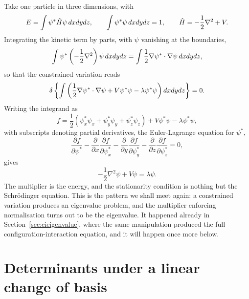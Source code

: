Take one particle in three dimensions, with
\begin{equation}
  E = \int \psi^{*}\hat{H}\psi\,dxdydz,
  \qquad
  \int \psi^{*}\psi\,dxdydz = 1,
  \qquad
  \hat{H} = -\frac{1}{2}\nabla^2 + V .
  \label{eq:6-oneparticle}
\end{equation}
Integrating the kinetic term by parts, with $\psi$ vanishing at the
boundaries,
\begin{equation}
  \int \psi^{*}\left(-\frac{1}{2}\nabla^2\right)\psi\,dxdydz
  = \int \frac{1}{2}\nabla\psi^{*}\cdot\nabla\psi\,dxdydz,
  \label{eq:6-byparts}
\end{equation}
so that the constrained variation reads
\begin{equation}
  \delta\left\{\int\left(\frac{1}{2}\nabla\psi^{*}\cdot\nabla\psi
    + V\psi^{*}\psi - \lambda\psi^{*}\psi\right)
    dxdydz\right\} = 0 .
  \label{eq:6-constrainedvariation}
\end{equation}
Writing the integrand as
\begin{equation}
  f = \frac{1}{2}\left(\psi^{*}_x\psi_x + \psi^{*}_y\psi_y
      + \psi^{*}_z\psi_z\right) + V\psi^{*}\psi - \lambda\psi^{*}\psi,
  \label{eq:6-integrand}
\end{equation}
with subscripts denoting partial derivatives, the Euler-Lagrange equation for
$\psi^{*}$,
\begin{equation}
  \frac{\partial f}{\partial\psi^{*}}
  - \frac{\partial}{\partial x}\frac{\partial f}{\partial\psi^{*}_x}
  - \frac{\partial}{\partial y}\frac{\partial f}{\partial\psi^{*}_y}
  - \frac{\partial}{\partial z}\frac{\partial f}{\partial\psi^{*}_z} = 0,
  \label{eq:6-eulerlagrange}
\end{equation}
gives
\begin{equation}
  -\frac{1}{2}\nabla^2\psi + V\psi = \lambda\psi .
  \label{eq:6-schrodinger}
\end{equation}
The multiplier is the energy, and the stationarity condition is nothing but
the Schr\"odinger equation.  This is the pattern we shall meet again: a
constrained variation produces an eigenvalue problem, and the multiplier
enforcing normalisation turns out to be the eigenvalue.  It happened already
in Section~\ref{sec:cieigenvalue}, where the same manipulation produced the
full configuration-interaction equation, and it will happen once more below.

\section{Determinants under a linear change of basis}
\label{sec:detbasis}


